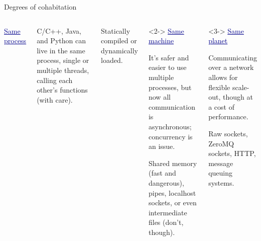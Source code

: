 \documentclass{beamer}
\begin{document}
\begin{frame}{Degrees of cohabitation}
\vspace{0.5 cm}
\begin{columns}[t]
\textcolor{darkblue}{\underline{Same process}} \hfill \mbox{ }

\vspace{0.25 cm}
C/C++, Java, and Python can live in the same process, single or multiple threads, calling each other's functions (with care).

\vspace{0.25 cm}
Statically compiled or dynamically loaded.

\begin{uncoverenv}<2->
\textcolor{darkblue}{\underline{Same machine}}

\vspace{0.25 cm}
It's safer and easier to use multiple processes, but now all communication is asynchronous; concurrency is an issue.

\vspace{0.25 cm}
\vspace{\baselineskip}
Shared memory (fast and dangerous), pipes, localhost sockets, or even intermediate files (don't, though).
\end{uncoverenv}

\begin{uncoverenv}<3->
\textcolor{darkblue}{\underline{Same planet}}

\vspace{0.25 cm}
Communicating over a network allows for flexible scale-out, though at a cost of performance.

\vspace{0.25 cm}
\vspace{2\baselineskip}
Raw sockets, ZeroMQ sockets, HTTP, message queuing systems.
\end{uncoverenv}
\end{columns}
\end{frame}
\end{document}
